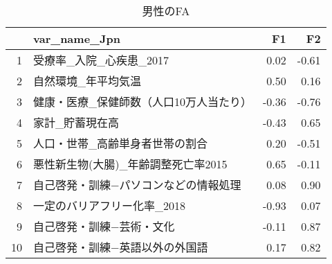 \begin{table}[ht]
\centering
\begingroup\tiny
\begin{tabular}{rlrr}
  \hline
 & var\_name\_Jpn & F1 & F2 \\ 
  \hline
1 & 受療率\_入院\_心疾患\_2017 & 0.02 & -0.61 \\ 
  2 & 自然環境\_年平均気温 & 0.50 & 0.16 \\ 
  3 & 健康・医療\_保健師数（人口10万人当たり） & -0.36 & -0.76 \\ 
  4 & 家計\_貯蓄現在高 & -0.43 & 0.65 \\ 
  5 & 人口・世帯\_高齢単身者世帯の割合 & 0.20 & -0.51 \\ 
  6 & 悪性新生物(大腸)\_年齢調整死亡率2015 & 0.65 & -0.11 \\ 
  7 & 自己啓発・訓練−パソコンなどの情報処理 & 0.08 & 0.90 \\ 
  8 & 一定のバリアフリー化率\_2018 & -0.93 & 0.07 \\ 
  9 & 自己啓発・訓練−芸術・文化 & -0.11 & 0.87 \\ 
  10 & 自己啓発・訓練−英語以外の外国語 & 0.17 & 0.82 \\ 
   \hline
\end{tabular}
\endgroup
\caption{男性のFA} 
\label{FAm}
\end{table}
